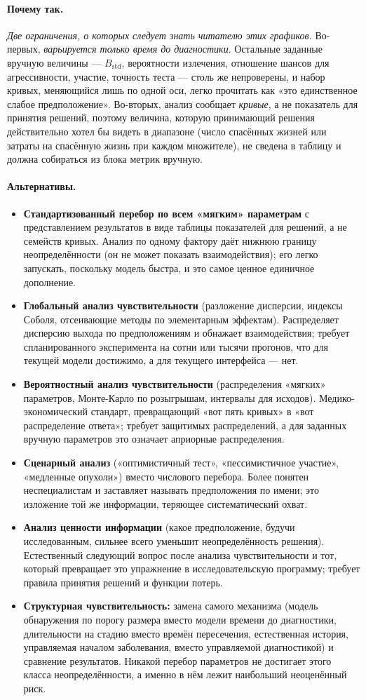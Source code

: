 \documentclass[12pt,a4paper]{article}
\newcommand{\why}[1]{\paragraph{Почему так.} #1}
\newcommand{\alt}[1]{\paragraph{Альтернативы.} #1}
\begin{document}
\why{\emph{Две ограничения, о которых следует знать читателю этих графиков.} Во-первых, \emph{варьируется
только время до диагностики}. Остальные заданные вручную величины --- $B_{\text{std}}$, вероятности
излечения, отношение шансов для агрессивности, участие, точность теста --- столь же непроверены, и набор
кривых, меняющийся лишь по одной оси, легко прочитать как «это единственное слабое предположение».
Во-вторых, анализ сообщает \emph{кривые}, а не показатель для принятия решений, поэтому величина, которую
принимающий решения действительно хотел бы видеть в диапазоне (число спасённых жизней или затраты на
спасённую жизнь при каждом множителе), не сведена в таблицу и должна собираться из блока метрик вручную.}

\alt{\begin{itemize}[nosep]
  \item \textbf{Стандартизованный перебор по всем «мягким» параметрам} с представлением результатов в виде
        таблицы показателей для решений, а не семейств кривых. Анализ по одному фактору даёт нижнюю границу
        неопределённости (он не может показать взаимодействия); его легко запускать, поскольку модель быстра,
        и это самое ценное единичное дополнение.
  \item \textbf{Глобальный анализ чувствительности} (разложение дисперсии, индексы Соболя, отсеивающие
        методы по элементарным эффектам). Распределяет дисперсию выхода по предположениям и обнажает
        взаимодействия; требует спланированного эксперимента на сотни или тысячи прогонов, что для текущей
        модели достижимо, а для текущего интерфейса --- нет.
  \item \textbf{Вероятностный анализ чувствительности} (распределения «мягких» параметров, Монте-Карло по
        розыгрышам, интервалы для исходов). Медико-экономический стандарт, превращающий «вот пять кривых» в
        «вот распределение ответа»; требует защитимых распределений, а для заданных вручную параметров это
        означает априорные распределения.
  \item \textbf{Сценарный анализ} («оптимистичный тест», «пессимистичное участие», «медленные опухоли»)
        вместо числового перебора. Более понятен неспециалистам и заставляет называть предположения по
        имени; это изложение той же информации, теряющее систематический охват.
  \item \textbf{Анализ ценности информации} (какое предположение, будучи исследованным, сильнее всего
        уменьшит неопределённость решения). Естественный следующий вопрос после анализа чувствительности и
        тот, который превращает это упражнение в исследовательскую программу; требует правила принятия
        решений и функции потерь.
  \item \textbf{Структурная чувствительность:} замена самого механизма (модель обнаружения по порогу
        размера вместо модели времени до диагностики, длительности на стадию вместо времён пересечения,
        естественная история, управляемая началом заболевания, вместо управляемой диагностикой) и сравнение
        результатов. Никакой перебор параметров не достигает этого класса неопределённости, а именно в нём
        лежит наибольший неоценённый риск.
\end{itemize}}
\end{document}
